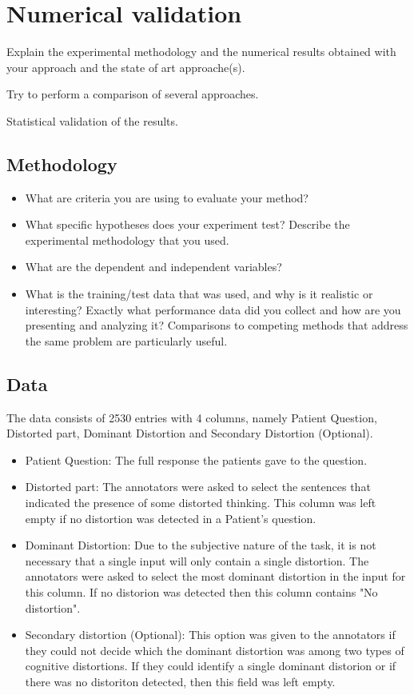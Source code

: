\documentclass[runningheads,a4paper,11pt]{report}
\begin{document}
\section{Numerical validation}
\label{section:numericalValidaion}


Explain the experimental methodology and the numerical results obtained with your approach and the state of art approache(s).

Try to perform a comparison of several approaches.

Statistical validation of the results.


\subsection{Methodology}
\label{section:methodology}

\begin{itemize}
	\item What are criteria you are using to evaluate your method? 
	\item What specific hypotheses does your experiment test? Describe the experimental methodology that you used. 
	\item What are the dependent and independent variables? 
	\item What is the training/test data that was used, and why is it realistic or interesting? Exactly what performance data did you collect and how are you presenting and analyzing it? Comparisons to competing methods that address the same problem are particularly useful.
\end{itemize}

\subsection{Data}
\label{section:data}

The data consists of 2530 entries with 4 columns, namely Patient Question, Distorted part, Dominant Distortion and Secondary Distortion (Optional).

\begin{itemize}
\item Patient Question: The full response the patients gave to the question.
\item Distorted part: The annotators were asked to select the sentences that indicated the presence of some distorted thinking. This column was left empty if no distortion was detected in a Patient's question.
\item Dominant Distortion: Due to the subjective nature of the task, it is not necessary that a single input will only contain a single distortion. The annotators were asked to select the most dominant distortion in the input for this column. If no distorion was detected then this column contains "No distortion".
\item Secondary distortion (Optional): This option was given to the annotators if they could not decide which the dominant distortion was among two types of cognitive distortions. If they could identify a single dominant distorion or if there was no distoriton detected, then this field was left empty.
\end{itemize}
\end{document}
